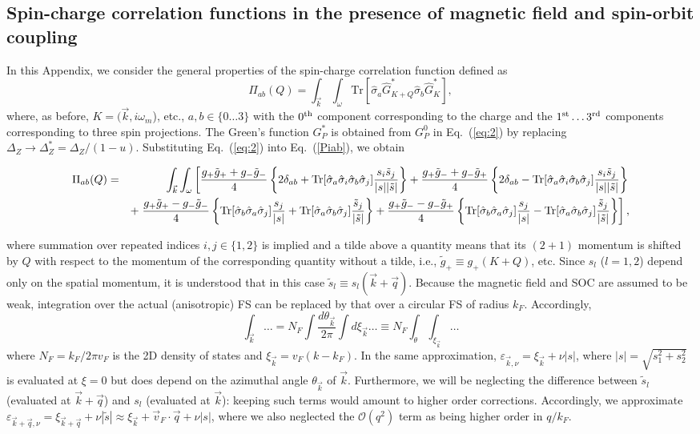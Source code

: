 \documentclass[prb,aps,twocolumn]{revtex4}
\newcommand{\beq}{\begin{equation}}
\newcommand{\eeq}{\end{equation}}
\newcommand{\bea}{\begin{eqnarray}}
\newcommand{\eea}{\end{eqnarray}}
\newcommand{\e}{\varepsilon}
\newcommand{\bk}{{\vec k}}
\newcommand{\bq}{{\vec q}}
\newcommand{\nn}{\nonumber}
\begin{document}
\subsection{Spin-charge correlation functions in the presence of magnetic field and spin-orbit coupling}
\label{app:bubble} In this Appendix, we consider the general
properties of the spin-charge correlation function defined as \beq
\Pi_{ab}(Q)=\int_{\vec k} \int_\omega \text{Tr} \left[\hat\sigma_a
\hat G^*_{K+Q} \hat\sigma_b \hat G^*_{K}\right], \label{Piab}\eeq
where, as before, $K=(\bk,i\omega_m$), etc., $a,b\in\{0 \dots 3\}$
with the $0^{\rm th}$ component corresponding to the charge and
the $1^{\rm st}\dots 3^{\rm rd}$ components corresponding to three
spin projections. The Green's function $G^*_P$ is obtained from
$G^0_P$ in Eq.~(\ref{eq:2}) by replacing
$\Delta_Z\to\Delta_Z^*=\Delta_Z/(1-u)$. Substituting
Eq.~(\ref{eq:2}) into  Eq.~(\ref{Piab}), we obtain
\begin{widetext} \bea\label{eq:bare}
\Pi_{ab}(Q)&=&\int_{\bk}\int_\omega\left[\frac{g_+\tilde{g}_++g_-\tilde{g}_-}{4}\left\{2\delta_{ab}+
{\rm
Tr}[\hat\sigma_a\hat\sigma_i\hat\sigma_b\hat\sigma_j]\frac{s_i\tilde{s}_j}{|s||\tilde
s|}\right\}+
\frac{g_+\tilde{g}_-+g_-\tilde{g}_+}{4}\left\{2\delta_{ab}-
{\rm Tr}[\hat\sigma_a\hat\sigma_i\hat\sigma_b\hat\sigma_j]\frac{s_i\tilde{s}_j}{|s||\tilde s|}\right\}\right.\nonumber\\
&& + \left. \frac{g_+\tilde{g}_+-g_-\tilde{g}_-}{4}\left\{{\rm
Tr}[\hat\sigma_b\hat\sigma_a\hat\sigma_j]\frac{s_j}{|s|}+ {\rm
Tr}[\hat\sigma_a\hat\sigma_b\hat\sigma_j]\frac{\tilde{s}_j}{|\tilde
s|}\right\}+ \frac{g_+\tilde{g}_--g_-\tilde{g}_+}{4}\left\{{\rm
Tr}[\hat\sigma_b\hat\sigma_a\hat\sigma_j]\frac{s_j}{|s|}-
{\rm Tr}[\hat\sigma_a\hat\sigma_b\hat\sigma_j]\frac{\tilde{s}_j}{|\tilde s|}\right\}\right],\nn\\
\eea\end{widetext} where summation over repeated indices
$i,j\in\{1,2\}$ is implied and a tilde above a quantity means that
its $(2+1)$ momentum is shifted by $Q$ with respect to the
momentum of the corresponding quantity without a tilde, i.e.,
$\tilde g_+\equiv g_+(K+Q)$, etc. Since $s_l$ ($l=1,2$) depend
only on the spatial momentum, it is understood that in this case
$\tilde s_l\equiv s_l(\bk+\bq)$.  Because the magnetic field and
SOC are assumed to be weak, integration over the actual
(anisotropic) FS can be replaced by that over a circular FS of
radius $k_F$. Accordingly, \beq \int_\bk \dots=N_F\int
\frac{d\theta_{\bk}}{2\pi}\int d\xi_\bk\dots\equiv
N_F\int_\theta\int_{\xi_\bk}\dots \eeq where $N_F=k_F/2\pi v_F$ is
the 2D density of states and $\xi_\bk=v_F(k-k_F)$. In the same
approximation, $\e_{\bk,\nu}=\xi_\bk+\nu|s|$, where
$|s|=\sqrt{s_1^2+s_2^2}$ is evaluated at $\xi=0$ but does depend
on the azimuthal angle $\theta_{\bk}$ of $\bk$. Furthermore, we
will be neglecting the difference between $\tilde s_l$ (evaluated
at $\bk+\bq$) and $s_l$ (evaluated at $\bk$): keeping such terms
would amount to higher order corrections. Accordingly, we
approximate $\e_{\bk+\bq,\nu}=\xi_{\bk+\bq}+\nu |\tilde s|\approx
\xi_\bk+\vec v_F \cdot \bq+\nu |s|$, where we also neglected the
${\mathcal O}(q^2)$ term as being higher order in $q/k_F$.
\end{document}
